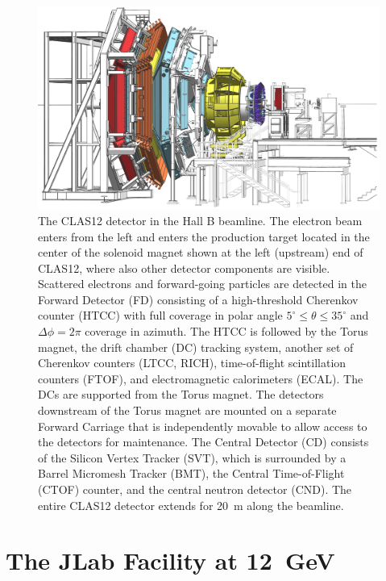 \documentclass[final,3p,twocolumn]{elsarticle}
\begin{document}
\begin{figure}[t]
\centering
\centerline{\includegraphics[width=1.8\columnwidth]{CLAS12-side-3.png}}
\caption{The CLAS12 detector in the Hall B beamline. The electron beam enters from the left and enters
  the production target located in the center of the solenoid magnet shown at the left (upstream) end of CLAS12, where
  also other detector components are visible. Scattered electrons and forward-going particles are detected in the
  Forward Detector (FD) consisting of a high-threshold Cherenkov counter (HTCC) with full coverage in polar angle
  $5^\circ \le \theta \le 35^\circ$ and $\Delta \phi = 2\pi$ coverage in azimuth. The HTCC is followed by the Torus
  magnet, the drift chamber (DC) tracking system, another set of Cherenkov counters (LTCC, RICH), time-of-flight
  scintillation counters (FTOF), and electromagnetic calorimeters (ECAL). The DCs are supported from the Torus magnet.
  The detectors downstream of the Torus magnet are mounted on a separate Forward Carriage that is independently
  movable to allow access to the detectors for maintenance. The Central Detector (CD) consists of the Silicon Vertex
  Tracker (SVT), which is surrounded by a Barrel Micromesh Tracker (BMT), the Central Time-of-Flight (CTOF) counter,
  and the central neutron detector (CND). The entire CLAS12 detector extends for 20~m along the beamline.} 
\label{clas12}
\end{figure}

\section{The JLab Facility at 12~GeV}
\label{jlab}
\end{document}
